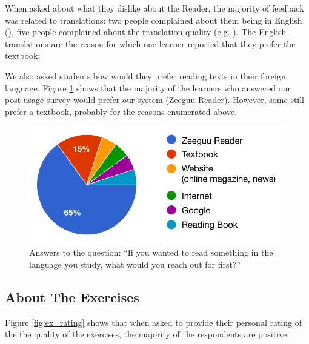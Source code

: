 
When asked about what they dislike about the Reader, the majority of feedback was related to translations: two people complained about them being in English (), five people complained about the translation quality (e.g. ). The English translations are the reason for which one learner reported that they prefer the textbook: 


We also asked students how would they prefer reading texts in their foreign language.
 Figure \ref{fig:preferred_reader} shows that the majority of the learners who answered our post-usage survey would prefer our system (Zeeguu Reader). However, some still prefer a textbook, probably for the reasons enumerated above.

 \begin{figure}[h!]
    \centering
      \includegraphics[width=0.6\columnwidth]{figures/opinions/reader_vs_textbook.pdf}
      \caption{Answers to the question: {``If you wanted to read something in the language you study, what would you reach out for first?''}}
      \label{fig:preferred_reader}
    \end{figure}



\subsection{About The Exercises}
Figure \ref{fig:ex_rating} shows that when asked to provide their personal rating of the the quality of the exercises, the majority of the respondents are positive: 

